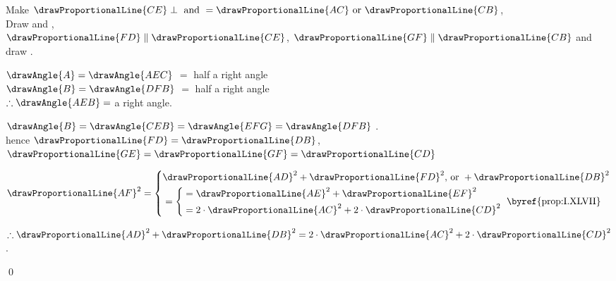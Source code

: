 \documentclass[booklanguage=english]{byrnebook}
\begin{document}
\begin{center}
Make $\drawProportionalLine{CE} \perp \mbox{ and } = \drawProportionalLine{AC} \mbox{ or } \drawProportionalLine{CB}$,\\
Draw  and ,\\
$\drawProportionalLine{FD} \parallel \drawProportionalLine{CE}$, $ \drawProportionalLine{GF} \parallel \drawProportionalLine{CB}$ and draw .

$\drawAngle{A} = \drawAngle{AEC}$  $=$ half a right angle \\
$\drawAngle{B} = \drawAngle{DFB}$  $=$ half a right angle \\
$\therefore \drawAngle{AEB} =$ a right angle.

$\drawAngle{B} = \drawAngle{CEB} = \drawAngle{EFG} = \drawAngle{DFB}$ .\\
hence $\drawProportionalLine{FD} = \drawProportionalLine{DB}$, $\drawProportionalLine{GE} = \drawProportionalLine{GF} = \drawProportionalLine{CD}$ 

$\drawProportionalLine{AF}^2 = \left\{
\begin{aligned}
&\drawProportionalLine{AD}^2 + \drawProportionalLine{FD}^2 \mbox{, or } + \drawProportionalLine{DB}^2 \\
&= \left\{
	\begin{aligned}
		&= \drawProportionalLine{AE}^2 + \drawProportionalLine{EF}^2 \\
		&= 2 \cdot \drawProportionalLine{AC}^2 + 2 \cdot \drawProportionalLine{CD}^2\\
	\end{aligned}
	\right. \mbox{ \byref{prop:I.XLVII}}
\end{aligned}\right.$

$\therefore \drawProportionalLine{AD}^2 + \drawProportionalLine{DB}^2 = 2 \cdot \drawProportionalLine{AC}^2 + 2 \cdot \drawProportionalLine{CD}^2$.
\end{center}

\qed
\end{document}

